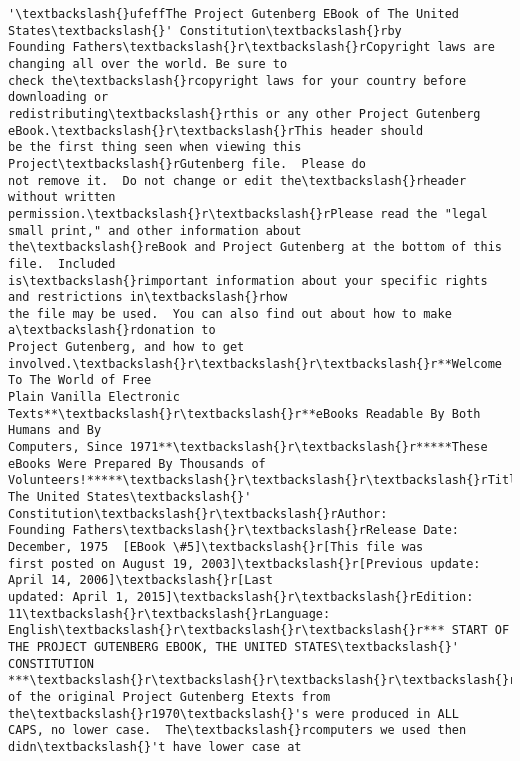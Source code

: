 \documentclass[11pt]{article}
\makeatletter
\newcommand{\boxspacing}{\kern\kvtcb@left@rule\kern\kvtcb@boxsep}
\newcommand{\prompt}[4]{
        \ttfamily\llap{{\color{#2}[#3]:\hspace{3pt}#4}}\vspace{-\baselineskip}
    }
\makeatother
\begin{document}
            \begin{tcolorbox}[breakable, size=fbox, boxrule=.5pt, pad at break*=1mm, opacityfill=0]
\prompt{Out}{outcolor}{22}{\boxspacing}
\begin{Verbatim}[commandchars=\\\{\}]
'\textbackslash{}ufeffThe Project Gutenberg EBook of The United States\textbackslash{}' Constitution\textbackslash{}rby
Founding Fathers\textbackslash{}r\textbackslash{}rCopyright laws are changing all over the world. Be sure to
check the\textbackslash{}rcopyright laws for your country before downloading or
redistributing\textbackslash{}rthis or any other Project Gutenberg eBook.\textbackslash{}r\textbackslash{}rThis header should
be the first thing seen when viewing this Project\textbackslash{}rGutenberg file.  Please do
not remove it.  Do not change or edit the\textbackslash{}rheader without written
permission.\textbackslash{}r\textbackslash{}rPlease read the "legal small print," and other information about
the\textbackslash{}reBook and Project Gutenberg at the bottom of this file.  Included
is\textbackslash{}rimportant information about your specific rights and restrictions in\textbackslash{}rhow
the file may be used.  You can also find out about how to make a\textbackslash{}rdonation to
Project Gutenberg, and how to get involved.\textbackslash{}r\textbackslash{}r\textbackslash{}r**Welcome To The World of Free
Plain Vanilla Electronic Texts**\textbackslash{}r\textbackslash{}r**eBooks Readable By Both Humans and By
Computers, Since 1971**\textbackslash{}r\textbackslash{}r*****These eBooks Were Prepared By Thousands of
Volunteers!*****\textbackslash{}r\textbackslash{}r\textbackslash{}rTitle: The United States\textbackslash{}' Constitution\textbackslash{}r\textbackslash{}rAuthor:
Founding Fathers\textbackslash{}r\textbackslash{}rRelease Date: December, 1975  [EBook \#5]\textbackslash{}r[This file was
first posted on August 19, 2003]\textbackslash{}r[Previous update: April 14, 2006]\textbackslash{}r[Last
updated: April 1, 2015]\textbackslash{}r\textbackslash{}rEdition: 11\textbackslash{}r\textbackslash{}rLanguage: English\textbackslash{}r\textbackslash{}r\textbackslash{}r*** START OF
THE PROJECT GUTENBERG EBOOK, THE UNITED STATES\textbackslash{}' CONSTITUTION ***\textbackslash{}r\textbackslash{}r\textbackslash{}r\textbackslash{}r\textbackslash{}rAll
of the original Project Gutenberg Etexts from the\textbackslash{}r1970\textbackslash{}'s were produced in ALL
CAPS, no lower case.  The\textbackslash{}rcomputers we used then didn\textbackslash{}'t have lower case at

\end{Verbatim}
\end{tcolorbox}
\end{document}
